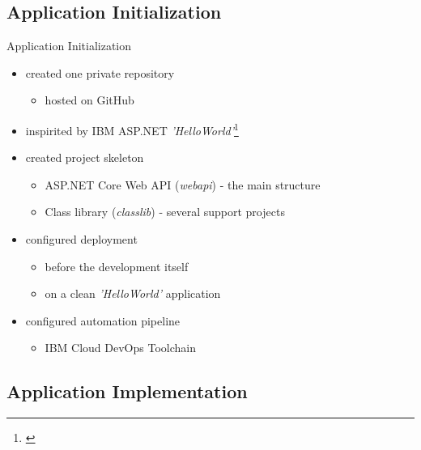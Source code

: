 \documentclass[]{beamer}
\begin{document}
  \subsection{Application Initialization}

    \begin{frame}{Application Initialization}
      \begin{itemize}
        \item created one private repository
        \begin{itemize}
          \item hosted on GitHub
        \end{itemize}
        \item inspirited by IBM ASP.NET \textit{'HelloWorld'}\footnote{\href{https://github.com/IBM-Cloud/aspnet-core-helloworld}{\color{urlcolor}{github.com/IBM-Cloud/aspnet-core-helloworld}}}
        \item created project skeleton
        \begin{itemize}
          \item ASP.NET Core Web API (\textit{webapi}) - the main structure
          \item Class library (\textit{classlib}) - several support projects
        \end{itemize}
        \item configured deployment
        \begin{itemize}
          \item before the development itself
          \item on a clean \textit{'HelloWorld'} application
        \end{itemize}
        \item configured automation pipeline
        \begin{itemize}
          \item IBM Cloud DevOps Toolchain
        \end{itemize}
      \end{itemize}
    \end{frame}

  \subsection{Application Implementation}
\end{document}

